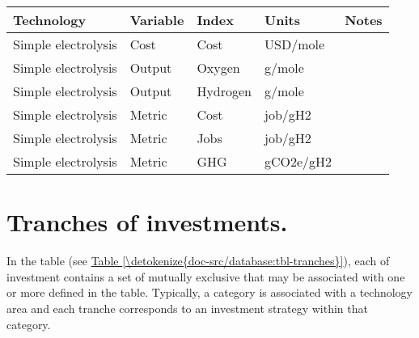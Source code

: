 \documentclass[letterpaper,10pt,english]{sphinxmanual}
\begin{document}
\begin{savenotes}\sphinxattablestart
\centering
{}
\sphinxthecaptionisattop
{}\label{\detokenize{doc-src/database:table-5}}\label{\detokenize{doc-src/database:tbl-results}}
\sphinxaftertopcaption
\begin{tabulary}{\linewidth}[t]{|T|T|T|T|T|}
\hline
\sphinxstyletheadfamily 
Technology
&\sphinxstyletheadfamily 
Variable
&\sphinxstyletheadfamily 
Index
&\sphinxstyletheadfamily 
Units
&\sphinxstyletheadfamily 
Notes
\\
\hline
Simple electrolysis
&
Cost
&
Cost
&
USD/mole
&\\
\hline
Simple electrolysis
&
Output
&
Oxygen
&
g/mole
&\\
\hline
Simple electrolysis
&
Output
&
Hydrogen
&
g/mole
&\\
\hline
Simple electrolysis
&
Metric
&
Cost
&
job/gH2
&\\
\hline
Simple electrolysis
&
Metric
&
Jobs
&
job/gH2
&\\
\hline
Simple electrolysis
&
Metric
&
GHG
&
gCO2e/gH2
&\\
\hline
\end{tabulary}
\par
\sphinxattableend\end{savenotes}


\section{Tranches of investments.}
\label{\detokenize{doc-src/database:tranches-of-investments}}
In the  table (see \hyperref[\detokenize{doc-src/database:tbl-tranches}]{Table \ref{\detokenize{doc-src/database:tbl-tranches}}}), each  of
investment contains a set of mutually exclusive  that may be
associated with one or more  defined in the 
table. Typically, a category is associated with a technology area and
each tranche corresponds to an investment strategy within that category.
\end{document}
